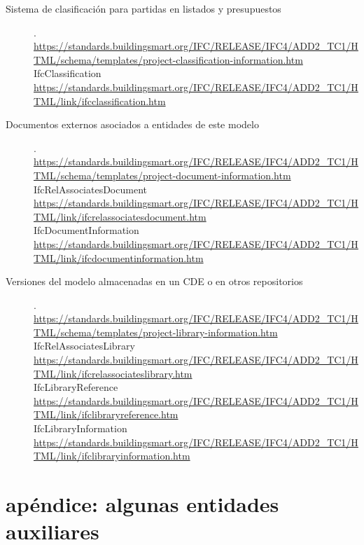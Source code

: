 \documentclass[spanish,12pt,a4paper,final,oneside]{book}
\begin{document}
\begin{description}
\item[Sistema de clasificación para partidas en listados y presupuestos].
\\ \url{https://standards.buildingsmart.org/IFC/RELEASE/IFC4/ADD2_TC1/HTML/schema/templates/project-classification-information.htm}
\\IfcClassification
\\ \url{https://standards.buildingsmart.org/IFC/RELEASE/IFC4/ADD2_TC1/HTML/link/ifcclassification.htm}

\item[Documentos externos asociados a entidades de este modelo].
\\ \url{https://standards.buildingsmart.org/IFC/RELEASE/IFC4/ADD2_TC1/HTML/schema/templates/project-document-information.htm}
\\IfcRelAssociatesDocument
\\ \url{https://standards.buildingsmart.org/IFC/RELEASE/IFC4/ADD2_TC1/HTML/link/ifcrelassociatesdocument.htm}
\\IfcDocumentInformation
\\ \url{https://standards.buildingsmart.org/IFC/RELEASE/IFC4/ADD2_TC1/HTML/link/ifcdocumentinformation.htm}

\item[Versiones del modelo almacenadas en un CDE o en otros repositorios].
\\ \url{https://standards.buildingsmart.org/IFC/RELEASE/IFC4/ADD2_TC1/HTML/schema/templates/project-library-information.htm}
\\IfcRelAssociatesLibrary
\\ \url{https://standards.buildingsmart.org/IFC/RELEASE/IFC4/ADD2_TC1/HTML/link/ifcrelassociateslibrary.htm}
\\IfcLibraryReference
\\ \url{https://standards.buildingsmart.org/IFC/RELEASE/IFC4/ADD2_TC1/HTML/link/ifclibraryreference.htm}
\\IfcLibraryInformation
\\ \url{https://standards.buildingsmart.org/IFC/RELEASE/IFC4/ADD2_TC1/HTML/link/ifclibraryinformation.htm}

\end{description}



\section{apéndice: algunas entidades auxiliares}
\end{document}
